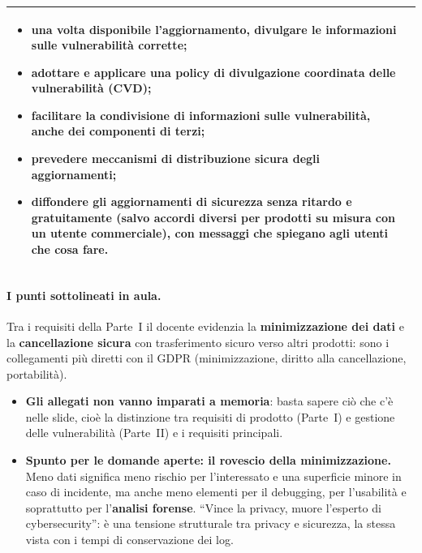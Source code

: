 \begin{center}
\begin{tabularx}{\linewidth}{>{\raggedright\arraybackslash}X >{\raggedright\arraybackslash}X}
\begin{itemize}[leftmargin=1.2em,nosep]
  \item una volta disponibile l'aggiornamento, \textbf{divulgare} le informazioni sulle vulnerabilità
    corrette;
  \item adottare e applicare una policy di \textbf{divulgazione coordinata delle vulnerabilità} (CVD);
  \item facilitare la condivisione di informazioni sulle vulnerabilità, anche dei componenti di terzi;
  \item prevedere meccanismi di \textbf{distribuzione sicura} degli aggiornamenti;
  \item diffondere gli aggiornamenti di sicurezza senza ritardo e \textbf{gratuitamente} (salvo accordi
    diversi per prodotti su misura con un utente commerciale), con messaggi che spiegano agli utenti che
    cosa fare.
\end{itemize}
\\
\bottomrule
\end{tabularx}
\end{center}

\paragraph{I punti sottolineati in aula.} Tra i requisiti della Parte~I il docente evidenzia la
\textbf{minimizzazione dei dati} e la \textbf{cancellazione sicura} con trasferimento sicuro verso altri
prodotti: sono i collegamenti più diretti con il GDPR (minimizzazione, diritto alla cancellazione,
portabilità).

\begin{esame}
\begin{itemize}
  \item \textbf{Gli allegati non vanno imparati a memoria}: basta sapere ciò che c'è nelle slide, cioè la
    distinzione tra requisiti di prodotto (Parte~I) e gestione delle vulnerabilità (Parte~II) e i
    requisiti principali.
  \item \textbf{Spunto per le domande aperte: il rovescio della minimizzazione.} Meno dati significa meno
    rischio per l'interessato e una superficie minore in caso di incidente, ma anche meno elementi per il
    debugging, per l'usabilità e soprattutto per l'\textbf{analisi forense}. ``Vince la privacy, muore
    l'esperto di cybersecurity'': è una tensione strutturale tra privacy e sicurezza, la stessa vista con
    i tempi di conservazione dei log.
\end{itemize}
\end{esame}

